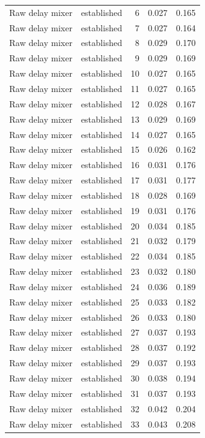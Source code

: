 \begin{tabular}{llrrr}
Raw delay mixer & established & 6 & 0.027 & 0.165 \\
Raw delay mixer & established & 7 & 0.027 & 0.164 \\
Raw delay mixer & established & 8 & 0.029 & 0.170 \\
Raw delay mixer & established & 9 & 0.029 & 0.169 \\
Raw delay mixer & established & 10 & 0.027 & 0.165 \\
Raw delay mixer & established & 11 & 0.027 & 0.165 \\
Raw delay mixer & established & 12 & 0.028 & 0.167 \\
Raw delay mixer & established & 13 & 0.029 & 0.169 \\
Raw delay mixer & established & 14 & 0.027 & 0.165 \\
Raw delay mixer & established & 15 & 0.026 & 0.162 \\
Raw delay mixer & established & 16 & 0.031 & 0.176 \\
Raw delay mixer & established & 17 & 0.031 & 0.177 \\
Raw delay mixer & established & 18 & 0.028 & 0.169 \\
Raw delay mixer & established & 19 & 0.031 & 0.176 \\
Raw delay mixer & established & 20 & 0.034 & 0.185 \\
Raw delay mixer & established & 21 & 0.032 & 0.179 \\
Raw delay mixer & established & 22 & 0.034 & 0.185 \\
Raw delay mixer & established & 23 & 0.032 & 0.180 \\
Raw delay mixer & established & 24 & 0.036 & 0.189 \\
Raw delay mixer & established & 25 & 0.033 & 0.182 \\
Raw delay mixer & established & 26 & 0.033 & 0.180 \\
Raw delay mixer & established & 27 & 0.037 & 0.193 \\
Raw delay mixer & established & 28 & 0.037 & 0.192 \\
Raw delay mixer & established & 29 & 0.037 & 0.193 \\
Raw delay mixer & established & 30 & 0.038 & 0.194 \\
Raw delay mixer & established & 31 & 0.037 & 0.193 \\
Raw delay mixer & established & 32 & 0.042 & 0.204 \\
Raw delay mixer & established & 33 & 0.043 & 0.208 \\

\end{tabular}
